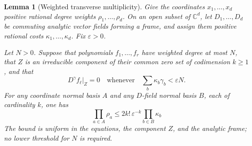 \documentclass[11pt]{article}
\newcommand{\CC}{\mathbb C}
\newtheorem{lemma}[theorem]{Lemma}
\theoremstyle{definition}
\theoremstyle{remark}
\numberwithin{equation}{section}
\begin{document}
\begin{lemma}[Weighted transverse multiplicity]
\label{geom:multiplicity}
Give the coordinates $x_1,\ldots,x_d$ positive rational degree weights
$\rho_1,\ldots,\rho_d$. On an open subset of $\CC^d$, let
$D_1,\ldots,D_d$ be commuting analytic vector fields forming a frame, and
assign them positive rational costs $\kappa_1,\ldots,\kappa_d$. Fix
$\varepsilon>0$.

Let $N>0$. Suppose that polynomials $f_1,\ldots,f_r$ have weighted degree at most $N$,
that $Z$ is an irreducible component of their common zero set of codimension
$k\ge1$, and that
\begin{equation}
\label{geom:persistent-derivatives}
 D^\gamma f_\ell\big|_Z=0
 \quad\text{whenever}\quad
 \sum_b\kappa_b\gamma_b<\varepsilon N.
\end{equation}
For any coordinate normal basis $A$ and any $D$-field normal basis $B$,
each of cardinality $k$, one has
\begin{equation}
\label{geom:multiplicity-comparison}
 \prod_{a\in A}\rho_a
 \le 2k!\,\varepsilon^{-k}\prod_{b\in B}\kappa_b
\end{equation}
The bound is uniform in the equations, the component $Z$, and the
analytic frame; no lower threshold for $N$ is required.
\end{lemma}
\end{document}
